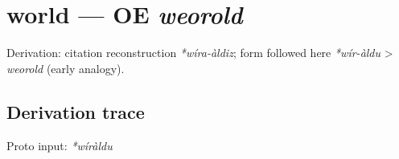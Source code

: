 \documentclass[
  british,
  a4paper,
  openany]{book}
\providecommand{\texorpdfstring}[2]{#1}
\begin{document}
\section{\texorpdfstring{world --- OE
\emph{weorold}}{world --- OE weorold}}\label{world-oe-weorold}


Derivation: citation reconstruction \emph{*wíra-àldiz}; form followed
here \emph{*wír-àldu} \textgreater{} \emph{weorold} (early analogy).

\subsection{Derivation trace}\label{derivation-trace-106}

Proto input: \emph{*wíràldu}

\begingroup
\setlength{\fboxsep}{6pt}
\end{document}
